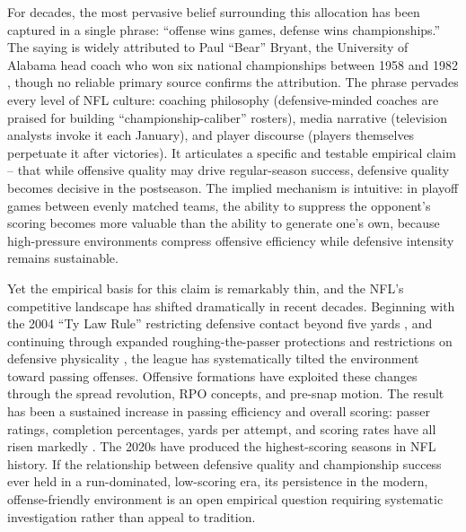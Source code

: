 \documentclass[12pt,a4paper]{article}
\begin{document}
For decades, the most pervasive belief surrounding this allocation has been captured in a single phrase: ``offense wins games, defense wins championships.'' The saying is widely attributed to Paul ``Bear'' Bryant, the University of Alabama head coach who won six national championships between 1958 and 1982 \citep{williams2010bearbryant}, though no reliable primary source confirms the attribution. The phrase pervades every level of NFL culture: coaching philosophy (defensive-minded coaches are praised for building ``championship-caliber'' rosters), media narrative (television analysts invoke it each January), and player discourse (players themselves perpetuate it after victories). It articulates a specific and testable empirical claim -- that while offensive quality may drive regular-season success, defensive quality becomes decisive in the postseason. The implied mechanism is intuitive: in playoff games between evenly matched teams, the ability to suppress the opponent's scoring becomes more valuable than the ability to generate one's own, because high-pressure environments compress offensive efficiency while defensive intensity remains sustainable.

Yet the empirical basis for this claim is remarkably thin, and the NFL's competitive landscape has shifted dramatically in recent decades. Beginning with the 2004 ``Ty Law Rule'' restricting defensive contact beyond five yards \citep{nflops2004rules}, and continuing through expanded roughing-the-passer protections and restrictions on defensive physicality \citep{pereira2018roughing}, the league has systematically tilted the environment toward passing offenses. Offensive formations have exploited these changes through the spread revolution, RPO concepts, and pre-snap motion. The result has been a sustained increase in passing efficiency and overall scoring: passer ratings, completion percentages, yards per attempt, and scoring rates have all risen markedly \citep{barnwell2019passingrevolution, nflscoring2023trends}. The 2020s have produced the highest-scoring seasons in NFL history. If the relationship between defensive quality and championship success ever held in a run-dominated, low-scoring era, its persistence in the modern, offense-friendly environment is an open empirical question requiring systematic investigation rather than appeal to tradition.
\end{document}
